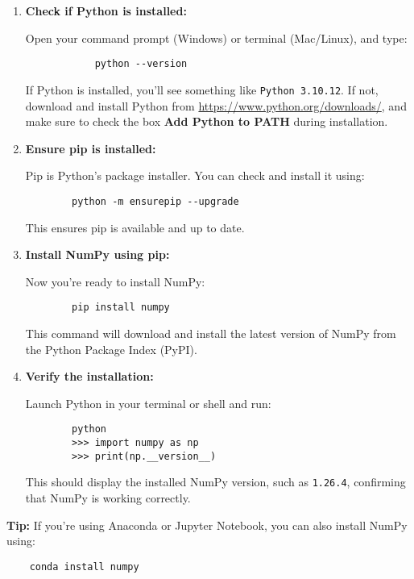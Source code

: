 \begin{enumerate}
	\item \textbf{Check if Python is installed:}
	
	Open your command prompt (Windows) or terminal (Mac/Linux), and type:
	\begin{framed}
		\begin{verbatim}
			python --version
		\end{verbatim}
	\end{framed}
	
	If Python is installed, you'll see something like \texttt{Python 3.10.12}. If not, download and install Python from \url{https://www.python.org/downloads/}, and make sure to check the box \textbf{Add Python to PATH} during installation.
	
	\item \textbf{Ensure pip is installed:}
	
	Pip is Python's package installer. You can check and install it using:
	\begin{framed}
	\begin{verbatim}
		python -m ensurepip --upgrade
	\end{verbatim}
\end{framed}
	This ensures pip is available and up to date.
	
	\item \textbf{Install NumPy using pip:}
	
	Now you're ready to install NumPy:
		\begin{framed}
	\begin{verbatim}
		pip install numpy
	\end{verbatim}
\end{framed}
	This command will download and install the latest version of NumPy from the Python Package Index (PyPI).
	
	\item \textbf{Verify the installation:}
	
	Launch Python in your terminal or shell and run:
		\begin{framed}
	\begin{verbatim}
		python
		>>> import numpy as np
		>>> print(np.__version__)
	\end{verbatim}
\end{framed}
	This should display the installed NumPy version, such as \texttt{1.26.4}, confirming that NumPy is working correctly.
\end{enumerate}

\textbf{Tip:} If you're using Anaconda or Jupyter Notebook, you can also install NumPy using:
\begin{framed}
\begin{verbatim}
	conda install numpy
	
\end{verbatim}
\end{framed}




